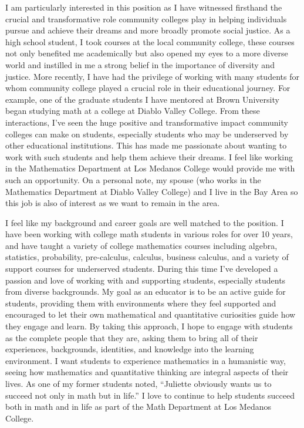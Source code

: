 \documentclass[11pt]{article}
\begin{document}
I am particularly interested in this position as I have witnessed firsthand the crucial and transformative role community colleges play in helping individuals pursue and achieve their dreams and more broadly promote social justice. As a high school student, I took courses at the local community college, these courses not only benefited me academically but also opened my eyes to a more diverse world and instilled in me a strong belief in the importance of diversity and justice. More recently, I have had the privilege of working with many students for whom community college played a crucial role in their educational journey. For example, one of the graduate students I have mentored at Brown University began studying math at a college at Diablo Valley College. From these interactions, I've seen the huge positive and transformative impact community colleges can make on students, especially students who may be underserved by other educational institutions. This has made me passionate about wanting to work with such students and help them achieve their dreams. I feel like working in the Mathematics Department at Los Medanos College would provide me with such an opportunity. On a personal note, my spouse (who works in the Mathematics Department at Diablo Valley College) and I live in the Bay Area so this job is also of interest as we want to remain in the area.

I feel like my background and career goals are well matched to the position. I have been working with college math students in various roles for over 10 years, and have taught a variety of college mathematics courses including algebra, statistics, probability, pre-calculus, calculus, business calculus, and a variety of support courses for underserved students. During this time I've developed a passion and love of working with and supporting students, especially students from diverse backgrounds. My goal as an educator is to be an active guide for students, providing them with environments where they feel supported and encouraged to let their own mathematical and quantitative curiosities guide how they engage and learn. By taking this approach, I hope to engage with students as the complete people that they are, asking them to bring all of their experiences, backgrounds, identities, and knowledge into the learning environment. I want students to experience mathematics in a humanistic way, seeing how mathematics and quantitative thinking are integral aspects of their lives.  As one of my former students noted, ``Juliette obviously wants us to succeed not only in math but in life.''  I love to continue to help students succeed both in math and in life as part of the Math Department at Los Medanos College. 
\end{document}
